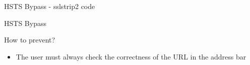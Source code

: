 \documentclass{beamer}
\begin{document}
\begin{frame}{HSTS Bypass - sslstrip2 code}
\end{frame}
\begin{frame}{HSTS Bypass}

  \begin{block}{How to prevent?}
    \begin{itemize}
      \pause
      \item The user must always check the correctness of the URL in the address bar
    \end{itemize}
  \end{block}
\end{frame}
\end{document}
